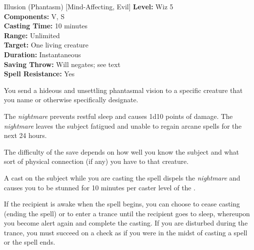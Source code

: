 {Illusion (Phantasm) [Mind-Affecting, Evil]}
{
	\textbf{Level:}
	Wiz 5\\
	\textbf{Components:}
	V, S\\
	\textbf{Casting Time:}
	10 minutes\\
	\textbf{Range:}
	Unlimited\\
	\textbf{Target:}
	One living creature\\
	\textbf{Duration:}
	Instantaneous\\
	\textbf{Saving Throw:}
	Will negates; see text\\
	\textbf{Spell Resistance:}
	Yes\\
}
{
	You send a hideous and unsettling phantasmal vision to a specific creature that you name or otherwise specifically designate.

	The \emph{nightmare} prevents restful sleep and causes 1d10 points of damage. The \emph{nightmare} leaves the subject fatigued and unable to regain arcane spells for the next 24 hours.



	The difficulty of the save depends on how well you know the subject and what sort of physical connection (if any) you have to that creature.

A  cast on the subject while you are casting the spell dispels the \emph{nightmare} and causes you to be stunned for 10 minutes per caster level of the .

	If the recipient is awake when the spell begins, you can choose to cease casting (ending the spell) or to enter a trance until the recipient goes to sleep, whereupon you become alert again and complete the casting. If you are disturbed during the trance, you must succeed on a  check as if you were in the midst of casting a spell or the spell ends.

}

